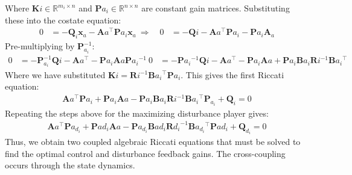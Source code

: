 \documentclass[3p]{elsarticle}
\begin{document}
Where $\mathbf{K}i \in \mathbb{R}^{m_i \times n}$ and $\mathbf{P}{a_i} \in \mathbb{R}^{n\times n}$ are constant gain matrices.
Substituting these into the costate equation:
\begin{align}
0 &= -\mathbf{Q}_i\mathbf{x}_a - \mathbf{A}a^\top \mathbf{P}{a_i}\mathbf{x}_a \
\Rightarrow \quad 0 &= -\mathbf{Q}i - \mathbf{A}a^\top \mathbf{P}{a_i} - \mathbf{P}{a_i}\mathbf{A}_a
\end{align}
Pre-multiplying by $\mathbf{P}_{a_i}^{-1}$:
\begin{align}
0 &= -\mathbf{P}_{a_i}^{-1}\mathbf{Q}i - \mathbf{A}a^\top  - \mathbf{P}{a_i}\mathbf{A}a\mathbf{P}{a_i}^{-1} \
0 &= -\mathbf{P}{a_i}^{-1}\mathbf{Q}i - \mathbf{A}a^\top  - \mathbf{P}{a_i}\mathbf{A}a + \mathbf{P}{a_i}\mathbf{B}{a_i}\mathbf{R}i^{-1}\mathbf{B}{a_i}^\top
\end{align}
Where we have substituted $\mathbf{K}i = \mathbf{R}i^{-1}\mathbf{B}{a_i}^\top\mathbf{P}{a_i}$.
This gives the first Riccati equation:
\begin{align}
\mathbf{A}a^\top \mathbf{P}{a_i} + \mathbf{P}{a_i}\mathbf{A}a - \mathbf{P}{a_i}\mathbf{B}{a_i}\mathbf{R}i^{-1}\mathbf{B}{a_i}^\top\mathbf{P}_{a_i} + \mathbf{Q}_i = 0
\end{align}
Repeating the steps above for the maximizing disturbance player gives:
\begin{align}
\mathbf{A}a^\top \mathbf{P}{a_{d_i}} + \mathbf{P}{a{d_i}}\mathbf{A}a - \mathbf{P}{a_{d_i}}\mathbf{B}{a{d_i}}\mathbf{R}{d_i}^{-1}\mathbf{B}{a_{d_i}}^\top\mathbf{P}{a{d_i}} + \mathbf{Q}_{d_i} = 0
\end{align}
Thus, we obtain two coupled algebraic Riccati equations that must be solved to find the optimal control and disturbance feedback gains. The cross-coupling occurs through the state dynamics.



\vspace{-0.3cm}
  
 

\newpage
\appendix
\end{document}
